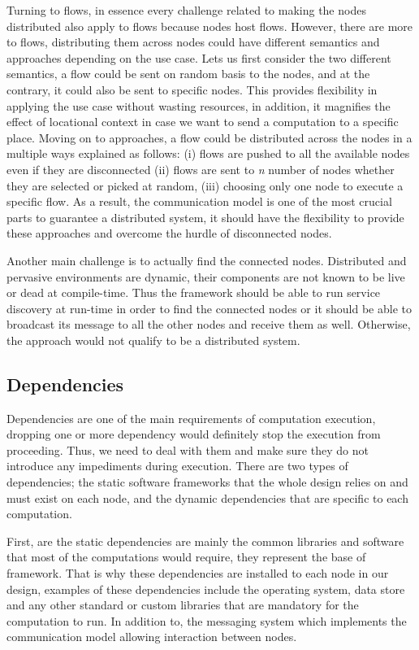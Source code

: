 Turning to flows, in essence every challenge related to making the nodes distributed also apply to flows because nodes host flows. However, there are more to flows, distributing them across nodes could have different semantics and approaches depending on the use case.
 Lets us first consider the two different semantics, a flow could be sent on random basis to the nodes, and at the contrary, it could also be sent to specific nodes. This provides flexibility in applying the use case without wasting resources, in addition, it magnifies the effect of locational context in case we want to send a computation to a specific place.
 Moving on to approaches, a flow could be distributed across the nodes in a multiple ways explained as follows: (i) flows are pushed to all the available nodes even if they are disconnected (ii) flows are sent to \textit{n} number of nodes whether they are selected or picked at random, (iii) choosing only one node to execute a specific flow. As a result, the communication model is one of the most crucial parts to guarantee a distributed system, it should have the flexibility to provide these approaches and overcome the hurdle of disconnected nodes.
 

Another main challenge is to actually find the connected nodes. Distributed and pervasive environments are dynamic, their components are not known to be live or dead at compile-time. Thus the framework should be able to run service discovery at run-time in order to find the connected nodes or it should be able to broadcast its message to all the other nodes and receive them as well. Otherwise, the approach would not qualify to be a distributed system. 






\newpage


\subsection{Dependencies}

Dependencies are one of the main requirements of computation execution, dropping one or more dependency would definitely stop the execution from proceeding. Thus, we need to deal with them and make sure they do not introduce any impediments during execution.  There are two types of dependencies; the static software frameworks that the whole design relies on and must exist on each node, and the dynamic dependencies that are specific to each computation.

First, are the static dependencies are mainly the common libraries and software that most of the computations would require, they represent the base of framework. That is why these dependencies are installed to each node in our design, examples of these dependencies include the operating system, data store and any other standard or custom libraries that are mandatory for the computation to run. In addition to, the messaging system which implements the communication model allowing interaction between nodes. 

